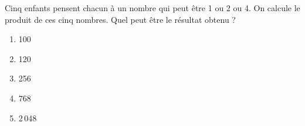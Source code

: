 Cinq enfants pensent chacun à un nombre qui peut être 1 ou 2 ou 4. On calcule le produit de ces cinq nombres. Quel peut être le résultat obtenu ?
\begin{multicols}{5}
  \begin{enumerate}[A/]
  \item 100
  \item 120
  \item 256
  \item 768
  \item 2\,048
  \end{enumerate}
\end{multicols}